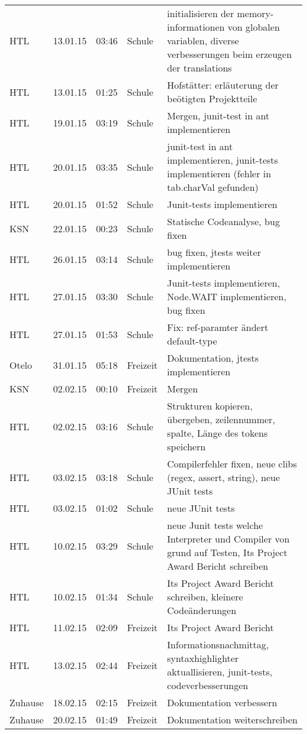 \begin{small}
\begin{longtable}{ p{} p{} p{} p{} p{}}
HTL	& 13.01.15	& 03:46	& Schule	& initialisieren der memory-informationen von globalen variablen, diverse verbesserungen beim erzeugen der translations \\
HTL	& 13.01.15	& 01:25	& Schule	& Hofst\"atter: erl\"auterung der be\"otigten Projektteile \\
HTL	& 19.01.15	& 03:19	& Schule	& Mergen, junit-test in ant implementieren \\
HTL	& 20.01.15	& 03:35	& Schule	& junit-test in ant implementieren, junit-tests implementieren (fehler in tab.charVal gefunden) \\
HTL	& 20.01.15	& 01:52	& Schule	& Junit-tests implementieren \\
KSN	& 22.01.15	& 00:23	& Schule	& Statische Codeanalyse, bug fixen \\
HTL	& 26.01.15	& 03:14	& Schule	& bug fixen, jtests weiter implementieren \\
HTL	& 27.01.15	& 03:30	& Schule	& Junit-tests implementieren, Node.WAIT implementieren, bug fixen \\
HTL	& 27.01.15	& 01:53	& Schule	& Fix: ref-paramter \"andert default-type \\
Otelo	& 31.01.15	& 05:18	& Freizeit	& Dokumentation, jtests implementieren \\
KSN	& 02.02.15	& 00:10	& Freizeit	& Mergen \\
HTL	& 02.02.15	& 03:16	& Schule	& Strukturen kopieren, \"ubergeben, zeilennummer, spalte, L\"ange des tokens speichern \\
HTL	& 03.02.15	& 03:18	& Schule	& Compilerfehler fixen, neue clibs (regex, assert, string), neue JUnit tests \\
HTL	& 03.02.15	& 01:02	& Schule	& neue JUnit tests \\
HTL	& 10.02.15	& 03:29	& Schule	& neue Junit tests welche Interpreter und Compiler von grund auf Testen, Its Project Award Bericht schreiben \\
HTL	& 10.02.15	& 01:34	& Schule	& Its Project Award Bericht schreiben, kleinere Code\"anderungen \\
HTL	& 11.02.15	& 02:09	& Freizeit	& Its Project Award Bericht \\
HTL	& 13.02.15	& 02:44	& Freizeit	& Informationsnachmittag, syntaxhighlighter aktuallisieren, junit-tests, codeverbesserungen \\
Zuhause	& 18.02.15	& 02:15	& Freizeit	& Dokumentation verbessern \\
Zuhause	& 20.02.15	& 01:49	& Freizeit	& Dokumentation weiterschreiben \\

\end{longtable}
\end{small}
